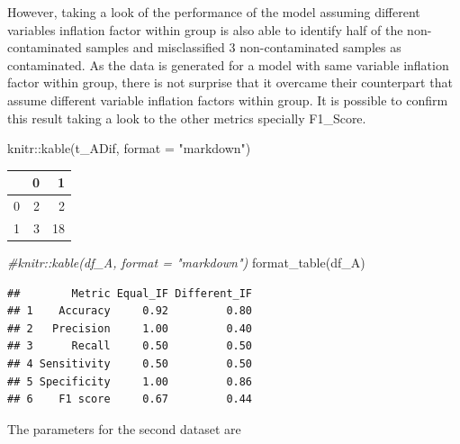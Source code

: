 \documentclass[
]{article}
\newenvironment{Shaded}{\begin{snugshade}}{\end{snugshade}}
\newcommand{\AttributeTok}[1]{\textcolor[rgb]{0.77,0.63,0.00}{#1}}
\newcommand{\CommentTok}[1]{\textcolor[rgb]{0.56,0.35,0.01}{\textit{#1}}}
\newcommand{\FunctionTok}[1]{\textcolor[rgb]{0.00,0.00,0.00}{#1}}
\newcommand{\NormalTok}[1]{#1}
\newcommand{\SpecialCharTok}[1]{\textcolor[rgb]{0.00,0.00,0.00}{#1}}
\newcommand{\StringTok}[1]{\textcolor[rgb]{0.31,0.60,0.02}{#1}}
\begin{document}
However, taking a look of the performance of the model assuming
different variables inflation factor within group is also able to
identify half of the non-contaminated samples and misclassified \(3\)
non-contaminated samples as contaminated. As the data is generated for a
model with same variable inflation factor within group, there is not
surprise that it overcame their counterpart that assume different
variable inflation factors within group. It is possible to confirm this
result taking a look to the other metrics specially F1\_Score.

\begin{Shaded}
\begin{Highlighting}[]
\NormalTok{knitr}\SpecialCharTok{::}\FunctionTok{kable}\NormalTok{(t\_ADif, }\AttributeTok{format =} \StringTok{"markdown"}\NormalTok{)}
\end{Highlighting}
\end{Shaded}

\begin{longtable}[]{@{}lrr@{}}
\toprule()
& 0 & 1 \\
\midrule()
\endhead
0 & 2 & 2 \\
1 & 3 & 18 \\
\bottomrule()
\end{longtable}

\begin{Shaded}
\begin{Highlighting}[]
\CommentTok{\#knitr::kable(df\_A, format = "markdown")}
\FunctionTok{format\_table}\NormalTok{(df\_A)}
\end{Highlighting}
\end{Shaded}

\begin{verbatim}
##        Metric Equal_IF Different_IF
## 1    Accuracy     0.92         0.80
## 2   Precision     1.00         0.40
## 3      Recall     0.50         0.50
## 4 Sensitivity     0.50         0.50
## 5 Specificity     1.00         0.86
## 6    F1 score     0.67         0.44
\end{verbatim}

The parameters for the second dataset are
\end{document}

